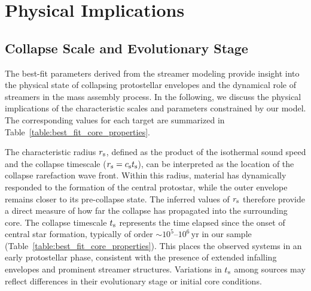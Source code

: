 \section{Physical Implications}
\subsection{Collapse Scale and Evolutionary Stage}
The best-fit parameters derived from the streamer modeling provide insight into the physical state of collapsing protostellar envelopes and the dynamical role of streamers in the mass assembly process. In the following, we discuss the physical implications of the characteristic scales and parameters constrained by our model. The corresponding values for each target are summarized in Table~\ref{table:best_fit_core_properties}.

The characteristic radius $r_{\rm s}$, defined as the product of the isothermal sound speed and the collapse timescale ($r_{\rm s}=c_{\rm s} t_{\rm s}$), can be interpreted as the location of the collapse rarefaction wave front. Within this radius, material has dynamically responded to the formation of the central protostar, while the outer envelope remains closer to its pre-collapse state. The inferred values of $r_{\rm s}$ therefore provide a direct measure of how far the collapse has propagated into the surrounding core. The collapse timescale $t_{\rm s}$ represents the time elapsed since the onset of central star formation, typically of order $\sim10^{5}$--$10^{6}\,\mathrm{yr}$ in our sample (Table~\ref{table:best_fit_core_properties}). This places the observed systems in an early protostellar phase, consistent with the presence of extended infalling envelopes and prominent streamer structures. Variations in $t_{\rm s}$ among sources may reflect differences in their evolutionary stage or initial core conditions.

